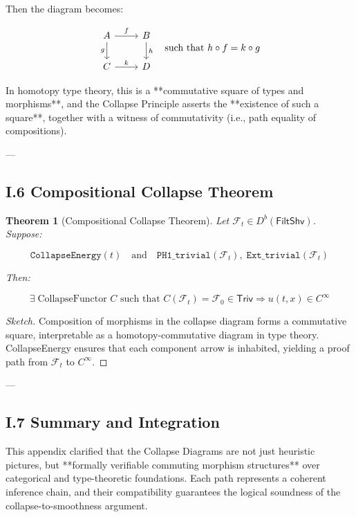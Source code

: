 \documentclass[11pt]{article}
\newtheorem{theorem}{Theorem}[section]
\begin{document}
Then the diagram becomes:

\[
\begin{tikzcd}
A \arrow[r, "f"] \arrow[d, "g"']
& B \arrow[d, "h"] \\
C \arrow[r, "k"]
& D
\end{tikzcd}
\quad \text{such that } h \circ f = k \circ g
\]

In homotopy type theory, this is a **commutative square of types and morphisms**,  
and the Collapse Principle asserts the **existence of such a square**,  
together with a witness of commutativity (i.e., path equality of compositions).

---

\subsection*{I.6 Compositional Collapse Theorem}

\begin{theorem}[Compositional Collapse Theorem]
Let \( \mathcal{F}_t \in D^b(\mathsf{FiltShv}) \).  
Suppose:

\[
\texttt{CollapseEnergy}(t) \quad \text{and} \quad \texttt{PH1\_trivial}(\mathcal{F}_t), \; \texttt{Ext\_trivial}(\mathcal{F}_t)
\]

Then:

\[
\exists \; \text{CollapseFunctor } C \text{ such that } C(\mathcal{F}_t) = \mathcal{F}_0 \in \mathsf{Triv}
\Rightarrow u(t,x) \in C^\infty
\]
\end{theorem}

\begin{proof}[Sketch]
Composition of morphisms in the collapse diagram forms a commutative square,  
interpretable as a homotopy-commutative diagram in type theory.  
CollapseEnergy ensures that each component arrow is inhabited,  
yielding a proof path from \( \mathcal{F}_t \) to \( C^\infty \).
\end{proof}

---

\subsection*{I.7 Summary and Integration}

This appendix clarified that the Collapse Diagrams are not just heuristic pictures,  
but **formally verifiable commuting morphism structures** over categorical and type-theoretic foundations.  
Each path represents a coherent inference chain, and their compatibility guarantees  
the logical soundness of the collapse-to-smoothness argument.
\end{document}
